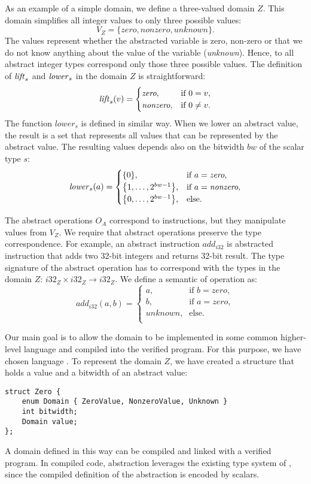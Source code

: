 As an example of a simple domain, we define a three-valued domain $Z$.
This domain simplifies all integer values to only three possible values:
\[ V_Z = \{ \textit{zero}, \textit{nonzero}, \textit{unknown} \}.\]
The values represent whether the abstracted variable is zero, non-zero or that
we do not know anything about the value of the variable (\emph{unknown}).
Hence, to all abstract integer types correspond only those three possible
values. The definition of $\mathit{lift}_s$ and $\mathit{lower}_s$ in the domain $Z$ is straightforward:
\[
  \mathit{lift}_s(v) =
  \begin{cases}
    \textit{zero},    & \text{if } 0 = v, \\
    \textit{nonzero}, & \text{if } 0 \not = v.\\
  \end{cases}
\]
The function $lower_s$ is defined in similar way. When we lower an
abstract value, the result is a set that represents all values that can be
represented by the abstract value. The resulting values depends also on the
bitwidth $bw$ of the scalar type $s$:
\[
  \mathit{lower}_s(a) =
  \begin{cases}
        \{0\},                            & \text{if } a = \textit{zero},\\
        \big\{1, \dots ,2^{bw - 1}\big\}, & \text{if } a = \textit{nonzero},\\
        \big\{0, \dots ,2^{bw - 1}\big\}, & \text{else}. \\
  \end{cases}
\]

The abstract operations $O_A$ correspond to \LLVM instructions, but they
manipulate values from $V_Z$. We require that abstract operations preserve the
type correspondence. For example, an abstract instruction $\mathit{add}_{i32}$ is
abstracted \LLVM instruction that adds two 32-bit integers and returns 32-bit
result. The type signature of the abstract operation has to correspond with the
types in the domain $Z$: ${i32}_Z \times {i32}_Z \to {i32}_Z$.
We define a semantic of operation as:
\[
  \mathit{add}_{i32}(a, b) =
  \begin{cases}
    a,      & \text{if } b = \textit{zero},\\
    b,      & \text{if } a = \textit{zero},\\
    \textit{unknown},   & \text{else}. \\
  \end{cases}
\]

Our main goal is to allow the domain to be implemented in some common higher-level
language and compiled into the verified program. For this purpose,
we have chosen language \Cpp{}. To represent the domain $Z$, we have created a
structure that holds a value and a bitwidth of an abstract value:
\begin{verbatim}
struct Zero {
    enum Domain { ZeroValue, NonzeroValue, Unknown }
    int bitwidth;
    Domain value;
};
\end{verbatim}
A domain defined in this way can be compiled and linked with a verified
program. In compiled code, abstraction leverages the existing type system of
\LLVM, since the compiled definition of the abstraction is encoded by \LLVM scalars.

